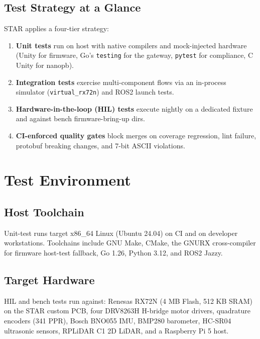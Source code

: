 \documentclass[11pt,letterpaper]{article}
\begin{document}
\subsection{Test Strategy at a Glance}
STAR applies a four-tier strategy:
\begin{enumerate}[leftmargin=1.4em,itemsep=2pt]
\item \textbf{Unit tests} run on host with native compilers and
      mock-injected hardware (Unity for firmware, Go's \texttt{testing}
      for the gateway, \texttt{pytest} for compliance, C Unity for
      nanopb).
\item \textbf{Integration tests} exercise multi-component flows via
      an in-process simulator (\texttt{virtual\_rx72n}) and ROS2
      launch tests.
\item \textbf{Hardware-in-the-loop (HIL) tests} execute nightly on a
      dedicated fixture and against bench firmware-bring-up dirs.
\item \textbf{CI-enforced quality gates} block merges on coverage
      regression, lint failure, protobuf breaking changes, and 7-bit
      ASCII violations.
\end{enumerate}

\section{Test Environment}
\label{sec:env}

\subsection{Host Toolchain}
Unit-test runs target x86\_64 Linux (Ubuntu 24.04) on CI and on
developer workstations. Toolchains include GNU Make, CMake, the
GNURX cross-compiler for firmware host-test fallback, Go 1.26,
Python 3.12, and ROS2 Jazzy.

\subsection{Target Hardware}
HIL and bench tests run against: Renesas RX72N (4 MB Flash, 512 KB
SRAM) on the STAR custom PCB, four DRV8263H H-bridge motor drivers,
quadrature encoders (341 PPR), Bosch BNO055 IMU, BMP280 barometer,
HC-SR04 ultrasonic sensors, RPLiDAR C1 2D LiDAR, and a Raspberry
Pi 5 host.
\end{document}
